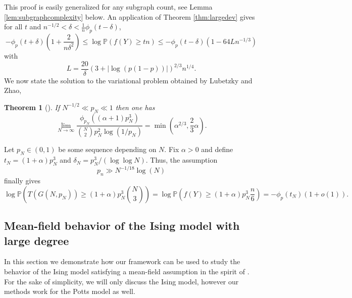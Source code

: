 \documentclass[12pt]{article}
\def \PP {\mathbb P}
\newtheorem{theorem}{Theorem}
\theoremstyle{definition}
\theoremstyle{remark}
\begin{document}
This proof is easily generalized for any subgraph count, see Lemma \ref{lem:subgraphcomplexity} below. An application of Theorem \ref{thm:largedev} gives for all $t$ and $n^{-1/2} < \delta < \tfrac{1}{n} \phi_p(t-\delta)$,
$$
- \phi_p(t+\delta) \left ( 1 + \frac{2}{n \delta^2} \right ) \leq \log \PP(f(Y) \geq tn) \leq - \phi_p(t-\delta) \left (1 - 64 L n^{-1/3} \right )
$$
with
$$
L = \frac{20}{\delta} \left ( 3 + |\log(p(1-p))| \right )^{2/3}  n^{1/4}.
$$ 
We now state the solution to the variational problem obtained by Lubetzky and Zhao,
\begin{theorem}[\cite{LZ14}]
If $N^{-1/2} \ll p_N \ll 1$ then one has
$$
\lim_{N \to \infty} \frac{\phi_{p_N}((\alpha+1) p_N^3 )}{{N \choose 2} p_N^2 \log(1/p_N)} = \min \left (\alpha^{2/3}, \frac{2}{3} \alpha \right ).
$$
\end{theorem}
Let $p_N \in (0,1)$ be some sequence depending on $N$. Fix $\alpha > 0$ and define $t_N = (1 + \alpha) p_N^3$ and $\delta_N = p_N^3 / (\log \log N)$. Thus, the assumption 
$$
p_n \gg N^{-1/18} \log(N)
$$ 
finally gives 
$$
\log \PP \left (T(G(N,p_N)) \geq (1+\alpha) p_N^3 { N \choose 3 } \right ) = \log \PP \left (f(Y) \geq (1+\alpha) p_N^3 \frac{n}{6} \right ) = - \phi_p(t_N) (1 + o(1)).
$$

\subsection{Mean-field behavior of the Ising model with large degree}

In this section we demonstrate how our framework can be used to study the behavior of the Ising model satisfying a mean-field assumption in the spirit of \cite{BM16}. For the sake of simplicity, we will only discuss the Ising model, however our methods work for the Potts model as well.
\end{document}
